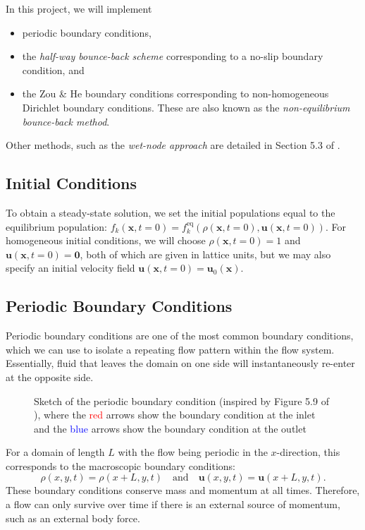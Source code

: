 \documentclass[a4paper, 11pt]{report}
\begin{document}
In this project, we will implement 
\begin{itemize}
    \item periodic boundary conditions,
    \item the \emph{half-way bounce-back scheme} corresponding to a no-slip boundary condition, and
    \item the Zou \& He boundary conditions corresponding to non-homogeneous Dirichlet boundary conditions. These are also known as the \emph{non-equilibrium bounce-back method}.
\end{itemize}
Other methods, such as the \emph{wet-node approach} are detailed in Section 5.3 of \cite{lbtextbook}.

\subsection{Initial Conditions}
To obtain a steady-state solution, we set the initial populations equal to the equilibrium population: $f_k(\mathbf{x},t=0) = f_k^{\mathrm{eq}}(\rho(\mathbf{x},t=0),\mathbf{u}(\mathbf{x},t=0))$. For homogeneous initial conditions, we will choose $\rho(\mathbf{x},t=0)=1$ and $\mathbf{u}(\mathbf{x},t=0)=\mathbf{0}$, both of which are given in lattice units, but we may also specify an initial velocity field $\mathbf{u}(\mathbf{x},t=0)=\mathbf{u}_0(\mathbf{x})$.
\newpage
\subsection{Periodic Boundary Conditions}
Periodic boundary conditions are one of the most common boundary conditions, which we can use to isolate a repeating flow pattern within the flow system. Essentially, fluid that leaves the domain on one side will instantaneously re-enter at the opposite side. 
\begin{figure}[!htb]
    \centering
    
\caption[Sketch of the periodic boundary condition]{Sketch of the periodic boundary condition (inspired by Figure 5.9 of \cite{lbtextbook}), where the \textcolor{red}{red} arrows show the boundary condition at the inlet and the \textcolor{blue}{blue} arrows show the boundary condition at the outlet} \label{fig:bbchannel}
\end{figure}

For a domain of length $L$ with the flow being periodic in the $x$-direction, this corresponds to the macroscopic boundary conditions:
\begin{equation}
    \rho(x, y, t) = \rho(x+L, y, t) \quad \text{and} \quad \mathbf{u}(x, y, t) = \mathbf{u}(x+L, y, t). \label{eq:3.45}
\end{equation}
These boundary conditions conserve mass and momentum at all times. Therefore, a flow can only survive over time if there is an external source of momentum, such as an external body force. 
\end{document}
